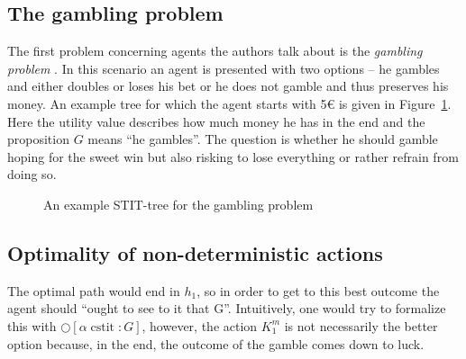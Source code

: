 \documentclass{article}
\newcommand{\cstit}{\operatorname{cstit}}
\begin{document}
\subsection{The gambling problem}
The first problem concerning agents the authors talk about is the \emph{gambling problem} \cite{mdl}. In this scenario an agent is presented with two options -- he gambles and either doubles or loses his bet or he does not gamble and thus preserves his money. An example tree for which the agent starts with 5€ is given in Figure~\ref{fig:gambling-tree}. Here the utility value describes how much money he has in the end and the proposition $G$ means \enquote{he gambles}. The question is whether he should gamble hoping for the sweet win but also risking to lose everything or rather refrain from doing so.

\begin{figure}[ht]
    \centering
    \caption{An example STIT-tree for the gambling problem}
    \label{fig:gambling-tree}
\end{figure}

\subsection{Optimality of non-deterministic actions}
The optimal path would end in $h_1$, so in order to get to this best outcome the agent should \enquote{ought to see to it that G}. Intuitively, one would try to formalize this with $\bigcirc[\alpha \cstit \colon G]$, however, the action $K^m_1$ is not necessarily the better option because, in the end, the outcome of the gamble comes down to luck. 
\end{document}
